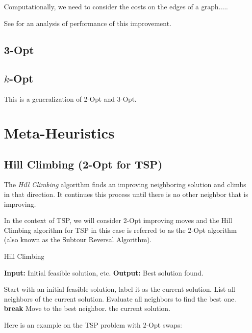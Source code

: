 Computationally, we need to consider the costs on the edges of a graph.....


See 
\cite{Englert2014} for an analysis of performance of this improvement.
\subsection{3-Opt}


\subsection{$k$-Opt}
This is a generalization of 2-Opt and 3-Opt.

\section{Meta-Heuristics}

\subsection{Hill Climbing (2-Opt for TSP)}
The \emph{Hill Climbing} algorithm finds an improving neighboring solution and climbs in that direction.  It continues this process until there is no other neighbor that is improving.  

In the context of TSP, we will consider 2-Opt improving moves and the Hill Climbing algorithm for TSP in this case is referred to as the 2-Opt algorithm (also known as the Subtour Reversal Algorithm).
\begin{algorithm}
\caption{Hill Climbing}
\begin{algorithmic}[1]
    \State \textbf{Input:} Initial feasible solution, etc.
    \State \textbf{Output:} Best solution found.
    
    \State Start with an initial feasible solution, label it as the current solution.
    \Repeat
        \State List all neighbors of the current solution.
        \State Evaluate all neighbors to find the best one.
            \State \textbf{break}
        \EndIf
        \State Move to the best neighbor.
    \State \Return the current solution.
\end{algorithmic}
\end{algorithm}


Here is an example on the TSP problem with 2-Opt swaps:


